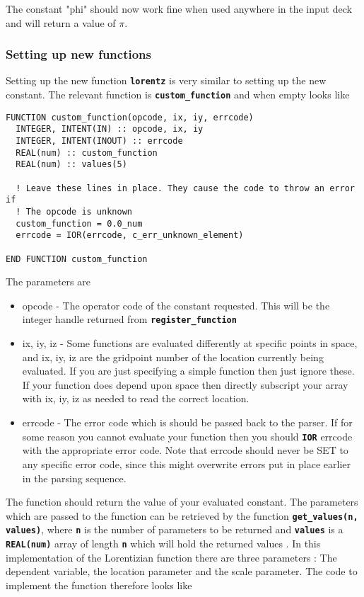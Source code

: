 \documentclass[12pt,a4paper]{article}
\newcommand{\simpleboxverbatim}{\begin{Verbatim}[obeytabs=true,frame=single,
  framerule=0.5mm,rulecolor=\color{warwickmid},formatcom=\color{black}]}
\newcommand{\inlinecode}[1]{{\color{warwickred} \bf\texttt{#1}}}
\begin{document}
The constant "phi" should now work fine when used anywhere in the input deck
and will return a value of $\pi$.

\subsubsection{Setting up new functions}

Setting up the new function \inlinecode{lorentz} is very similar to setting up
the new constant. The relevant function is \inlinecode{custom\_function} and
when empty looks like

\simpleboxverbatim
FUNCTION custom_function(opcode, ix, iy, errcode)
  INTEGER, INTENT(IN) :: opcode, ix, iy
  INTEGER, INTENT(INOUT) :: errcode
  REAL(num) :: custom_function
  REAL(num) :: values(5)

  ! Leave these lines in place. They cause the code to throw an error if
  ! The opcode is unknown
  custom_function = 0.0_num
  errcode = IOR(errcode, c_err_unknown_element)

END FUNCTION custom_function
\end{Verbatim}

The parameters are

\begin{itemize}
\item opcode - The operator code of the constant requested. This will be the
  integer handle returned from \inlinecode {register\_function}
\item ix, iy, iz - Some functions are evaluated differently at specific points
  in space, and ix, iy, iz are the gridpoint number of the location currently
  being evaluated. If you are just specifying a simple function then just
  ignore these. If your function does depend upon space then directly
  subscript your array with ix, iy, iz as needed to read the correct location.
\item errcode - The error code which is should be passed back to the
  parser. If for some reason you cannot evaluate your function then you should
  \inlinecode{IOR} errcode with the appropriate error code. Note that errcode
  should never be SET to any specific error code, since this might overwrite
  errors put in place earlier in the parsing sequence.
\end{itemize}

The function should return the value of your evaluated constant. The
parameters which are passed to the function can be retrieved by the function
\inlinecode {get\_values(n, values)}, where \inlinecode {n} is the number of
parameters to be returned and \inlinecode{values} is a \inlinecode{REAL(num)}
array of length \inlinecode{n} which will hold the returned values .  In this
implementation of the Lorentizian function there are three parameters : The
dependent variable, the location parameter and the scale parameter. The code
to implement the function therefore looks like
\end{document}
